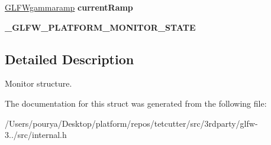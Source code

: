\begin{DoxyCompactItemize}
\item 
\hypertarget{struct__GLFWmonitor_a6761d674e05aecaf0cadf7e127f96d85}{}\hyperlink{structGLFWgammaramp}{G\+L\+F\+Wgammaramp} {\bfseries current\+Ramp}\label{struct__GLFWmonitor_a6761d674e05aecaf0cadf7e127f96d85}

\item 
\hypertarget{struct__GLFWmonitor_af4c9199778c3ed97cb34dff807576884}{}{\bfseries \+\_\+\+G\+L\+F\+W\+\_\+\+P\+L\+A\+T\+F\+O\+R\+M\+\_\+\+M\+O\+N\+I\+T\+O\+R\+\_\+\+S\+T\+A\+T\+E}\label{struct__GLFWmonitor_af4c9199778c3ed97cb34dff807576884}

\end{DoxyCompactItemize}


\subsection{Detailed Description}
Monitor structure. 

The documentation for this struct was generated from the following file\+:\begin{DoxyCompactItemize}
\item 
/\+Users/pourya/\+Desktop/platform/repos/tetcutter/src/3rdparty/glfw-\/3../src/internal.\+h\end{DoxyCompactItemize}
